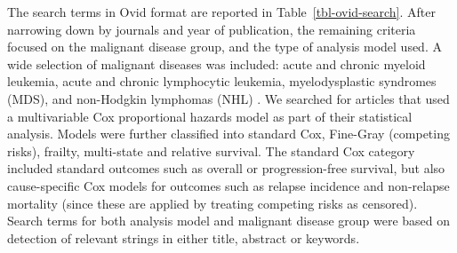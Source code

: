 \documentclass[
  letterpaper,
  paper=240mm:170mm,
  twoside=true,
  open=right,
  fontsize=10pt,
  pagesize=false,
  BCOR=15mm,
  DIV=14,
  headinclude=true,
  footinclude=false,
  headsepline=on]{scrbook}
\begin{document}
The search terms in Ovid format are reported in
Table~\ref{tbl-ovid-search}. After narrowing down by journals and year
of publication, the remaining criteria focused on the malignant disease
group, and the type of analysis model used. A wide selection of
malignant diseases was included: acute and chronic myeloid leukemia,
acute and chronic lymphocytic leukemia, myelodysplastic syndromes (MDS),
and non-Hodgkin lymphomas (NHL) . We searched for articles that used a
multivariable Cox proportional hazards model as part of their
statistical analysis. Models were further classified into standard Cox,
Fine-Gray (competing risks), frailty, multi-state and relative survival.
The standard Cox category included standard outcomes such as overall or
progression-free survival, but also cause-specific Cox models for
outcomes such as relapse incidence and non-relapse mortality (since
these are applied by treating competing risks as censored). Search terms
for both analysis model and malignant disease group were based on
detection of relevant strings in either title, abstract or keywords.

\begin{table}

\caption{\label{tbl-ovid-search}Search terms used in Ovid format, as
entered into MEDLINE and Embase.}


\end{table}%
\end{document}
